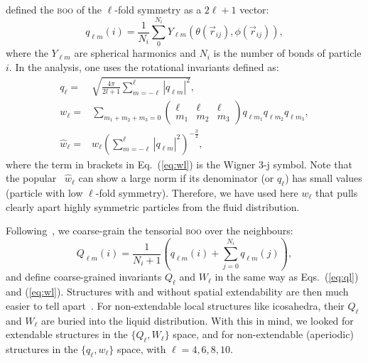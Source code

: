 \citet{steinhardt1983boo} defined the \textsc{boo} of the $\ell$-fold symmetry as a $2\ell+1$ vector:
\begin{equation}
	q_{\ell m}(i) = \frac{1}{N_i}\sum_{0}^{N_i} Y_{\ell m}(\theta(\vec r_{ij}),\phi(\vec r_{ij})),
	\label{eq:qlm}
\end{equation}
where the $Y_{\ell m}$ are spherical harmonics and $N_i$ is the number of bonds of particle $i$. In the analysis, one uses the rotational invariants defined as:
\begin{align}
	q_\ell =& \sqrt{\frac{4\pi}{2l+1} \sum_{m=-\ell}^{\ell} |q_{\ell m}|^2 }, \label{eq:ql}\\
	w_\ell =& \sum_{m_1+m_2+m_3=0} 
			\left( \begin{array}{ccc}
				\ell & \ell & \ell \\
				m_1 & m_2 & m_3 
			\end{array} \right)
			q_{\ell m_1} q_{\ell m_2} q_{\ell m_3}, \label{eq:wl}\\
	\hat{w}_\ell =& w_\ell{\left( \sum_{m=-\ell}^{\ell} |q_{\ell m}|^2 \right)}^{-\frac{3}{2}},
\end{align}
where the term in brackets in Eq.~(\ref{eq:wl}) is the Wigner 3-j symbol. Note that the popular~\citep{steinhardt1983boo,Lechner2008} $\hat{w}_\ell$ can show a large norm if its denominator (or $q_\ell$) has small values (particle with low $\ell$-fold symmetry). Therefore, we have used here $w_\ell$ that pulls clearly apart highly symmetric particles from the fluid distribution.

Following~\citet{Lechner2008}, we coarse-grain the tensorial \textsc{boo} over the neighbours:
\begin{equation}
	Q_{\ell m}(i) = \frac{1}{N_i+1}\left( q_{\ell m}(i) +  \sum_{j=0}^{N_i} q_{\ell m}(j)\right), 
	\label{eq:Qlm}
\end{equation}
and define coarse-grained invariants $Q_\ell$ and $W_\ell$ in the same way as Eqs.~(\ref{eq:ql}) and (\ref{eq:wl}). Structures with and without spatial extendability are then much easier to tell apart~\citep{Lechner2008}. For non-extendable local structures like icosahedra, their $Q_\ell$ and $W_\ell$ are buried into the liquid distribution. With this in mind, we looked for extendable structures in the $\lbrace Q_\ell, W_\ell\rbrace$ space, and for non-extendable (aperiodic) structures in the $\lbrace q_\ell, w_\ell\rbrace$ space, with $\ell=4,6,8,10$.

